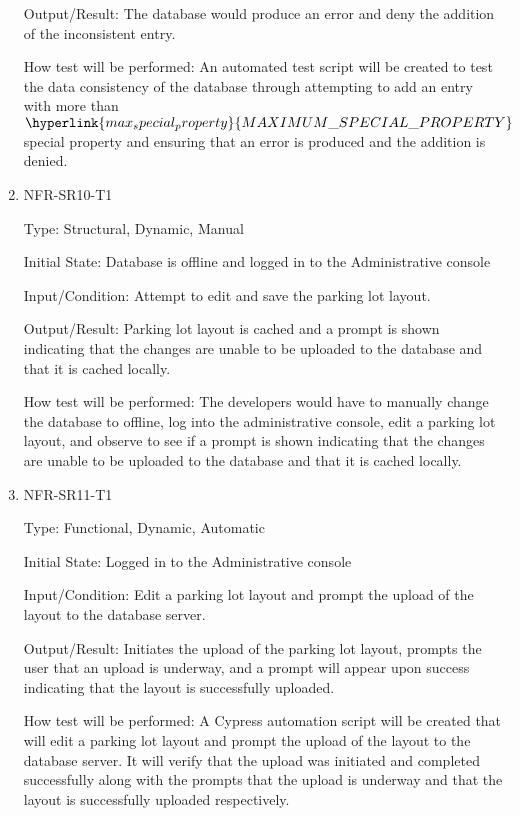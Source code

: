\documentclass[12pt, titlepage]{article}
\begin{document}
\begin{enumerate}
Output/Result: The database would produce an error and deny the addition of the
inconsistent entry.

How test will be performed: An automated test script will be created to test the
data consistency of the database through attempting to add an entry with more
than $\hyperlink{max_special_property}{MAXIMUM\_SPECIAL\_PROPERTY}$ special
property and ensuring that an error is produced and the addition is denied.

\item{NFR-SR10-T1}

Type: Structural, Dynamic, Manual
					
Initial State: Database is offline and logged in to the Administrative console
					
Input/Condition: Attempt to edit and save the parking lot layout.
					
Output/Result: Parking lot layout is cached and a prompt is shown indicating
that the changes are unable to be uploaded to the database and that it is cached
locally.

How test will be performed: The developers would have to manually change the
database to offline, log into the administrative console, edit a parking lot
layout, and observe to see if a prompt is shown indicating that the changes are
unable to be uploaded to the database and that it is cached locally.

\item{NFR-SR11-T1}

Type: Functional, Dynamic, Automatic
					
Initial State: Logged in to the Administrative console
					
Input/Condition: Edit a parking lot layout and prompt the upload of the layout
to the database server.
					
Output/Result: Initiates the upload of the parking lot layout, prompts the user
that an upload is underway, and a prompt will appear upon success indicating
that the layout is successfully uploaded.

How test will be performed: A Cypress automation script will be created that
will edit a parking lot layout and prompt the upload of the layout to the
database server. It will verify that the upload was initiated and completed
successfully along with the prompts that the upload is underway and that the
layout is successfully uploaded respectively.


\end{enumerate}
\end{document}
